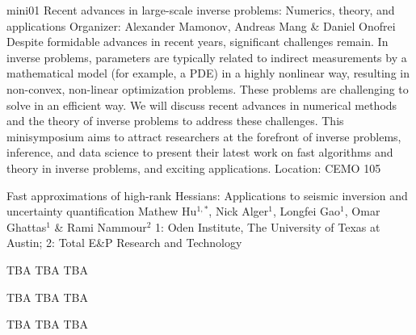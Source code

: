 \mini
{mini01}
{Recent advances in large-scale inverse problems: Numerics, theory, and applications}
{Organizer: Alexander Mamonov, Andreas Mang \& Daniel Onofrei}
{Despite formidable advances in recent years, significant challenges remain. In inverse problems, parameters are typically related to indirect measurements by a mathematical model (for example, a PDE) in a highly nonlinear way, resulting in non-convex, non-linear optimization problems. These problems are challenging to solve in an efficient way. We will discuss recent advances in numerical methods and the theory of inverse problems to address these challenges. This minisymposium aims to attract researchers at the forefront of inverse problems, inference, and data science to present their latest work on fast algorithms and theory in inverse problems, and exciting applications.}
{Location: CEMO 105}


\begin{talks}
\item\talk
{Fast approximations of high-rank Hessians: Applications to seismic inversion and uncertainty quantification}
{Mathew Hu$^{1,*}$, Nick Alger$^{1}$, Longfei Gao$^{1}$, Omar Ghattas$^{1}$ \& Rami Nammour$^{2}$}
{1: Oden Institute, The University of Texas at Austin; 2: Total E\&P Research and Technology}
\item\talk
{TBA}
{TBA}
{TBA}
\item\talk
{TBA}
{TBA}
{TBA}
\item\talk
{TBA}
{TBA}
{TBA}
\end{talks}

\room
